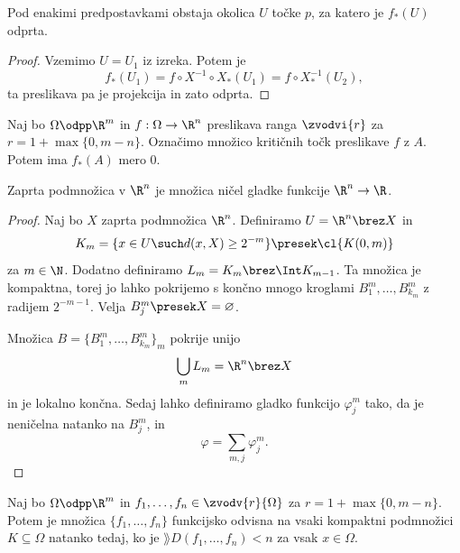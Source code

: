 
\begin{posledica}
  Pod enakimi predpostavkami obstaja okolica $U$ točke $p$, za katero je
  $f_*(U)$ odprta.
\end{posledica}

\begin{proof}
  Vzemimo $U = U_1$ iz izreka.
  Potem je
  \[
	f_*(U_1) = f \circ X^{-1} \circ X_* (U_1)
	= f \circ X^{-1}_*(U_2),
  \]
  ta preslikava pa je projekcija in zato odprta.
\end{proof}

\begin{izrek}[Sard]
  Naj bo $\Omega \odpp\R^m$ in $f: \Omega \to \R^n$ preslikava ranga
  $\zvodvi{r}$ za $r = 1 + \max\{0, m-n\}$.
  Označimo množico kritičnih točk preslikave $f$ z $A$.
  Potem ima $f_*(A)$ mero $0$.
\end{izrek}


\begin{lema}
  Zaprta podmnožica v $\R^n$ je množica ničel gladke funkcije $\R^n \to \R$.
\end{lema}

\begin{proof}
  Naj bo $X$ zaprta podmnožica $\R^n$.
  Definiramo $U = \R^n \brez X$ in
  \[
	K_m = \{x \in U \such d(x, X) \ge 2^{-m}\} \presek \cl{K(0, m)}
  \]
  za $m \in \N$.
  Dodatno definiramo $L_m = K_m \brez \Int K_{m-1}$.
  Ta množica je kompaktna, torej jo lahko pokrijemo s končno mnogo kroglami
  $B_1^m, \ldots, B_{k_m}^m$ z radijem $2^{-m-1}$.
  Velja $B_j^m \presek X = \varnothing$.

  Množica $B = \{B_1^m, \ldots, B_{k_m}^m\}_m$ pokrije unijo
  \[
	\bigcup_m L_m = \R^n \brez X
  \]
  in je lokalno končna.
  Sedaj lahko definiramo gladko funkcijo $\varphi_j^m$ tako, da je neničelna
  natanko na $B_j^m$, in
  \[
	\varphi = \sum_{m,j} \varphi_j^m.
  \]
\end{proof}


\begin{izrek}
  Naj bo $\Omega \odpp\R^m$ in $f_1, \ldots, f_n \in \zvodv{r}{\Omega}$ za $r =
  1 + \max \{0, m-n\}$.
  Potem je množica $\{f_1, \ldots, f_n\}$ funkcijsko odvisna na vsaki kompaktni
  podmnožici $K \subseteq \Omega$ natanko tedaj, ko je $\rang D(f_1, \ldots,
  f_n) < n$ za vsak $x \in \Omega$.
\end{izrek}

